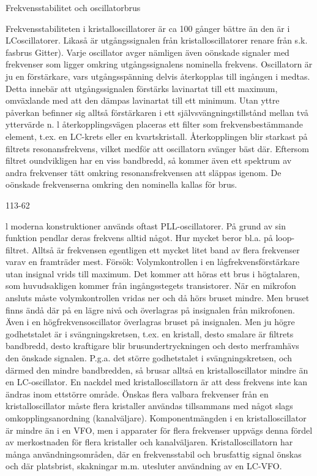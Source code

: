 \documentclass[a4paper,twoside,twocolumn,openright]{book}
\begin{document}
{{{{{{{Frekvensstabilitet och oscillatorbrus

Frekvensstabiliteten i kristalloscillatorer är
ca 100 gånger bättre än den är i LCoscillatorer. Likaså är utgångssignalen från
kristalloscillatorer renare från s.k. fasbrus
Gitter). Varje oscillator avger nämligen även
oönskade signaler med frekvenser som ligger omkring utgångssignalens nominella
frekvens.
Oscillatorn är ju en förstärkare, vars utgångsspänning delvis återkopplas till ingången i medtas. Detta innebär att utgångssignalen förstärks lavinartat till ett maximum, omväxlande med att den dämpas lavinartat till
ett minimum. Utan yttre påverkan befinner
sig alltså förstärkaren i ett självsvängningstillstånd mellan två yttervärde n. l återkopplingsvägen placeras ett filter som frekvensbestämmande element, t.ex. en LC-krets
eller en kvartskristall.
Återkopplingen blir starkast på filtrets
resonansfrekvens, vilket medför att oscillatorn svänger bäst där. Eftersom filtret oundvikligen har en viss bandbredd, så kommer
även ett spektrum av andra frekvenser tätt
omkring resonansfrekvensen att släppas
igenom. De oönskade frekvenserna omkring
den nominella kallas för brus.

113-62

l moderna konstruktioner används oftast
PLL-oscillatorer. På grund av sin funktion
pendlar deras frekvens alltid något. Hur
mycket beror bl.a. på loop-filtret. Alltså är
frekvensen egentligen ett mycket litet band
av flera frekvenser varav en framträder mest.
Försök:
Volymkontrollen i en lågfrekvensförstärkare
utan insignal vrids till maximum. Det kommer att höras ett brus i högtalaren, som
huvudsakligen kommer från ingångsstegets
transistorer. När en mikrofon ansluts måste
volymkontrollen vridas ner och då hörs bruset
mindre. Men bruset finns ändå där på en
lägre nivå och överlagras på insignalen från
mikrofonen.
Även i en högfrekvensoscillator överlagras bruset på insignalen. Men ju högre godhetstalet är i svängningskretsen, t.ex. en
kristall, desto smalare är filtrets bandbredd,
desto kraftigare blir brusundertryckningen
och desto merframhävs den önskade signalen. P.g.a. det större godhetstalet i svängningskretsen, och därmed den mindre bandbredden, så brusar alltså en kristalloscillator
mindre än en LC-oscillator.
En nackdel med kristalloscillatorn är att
dess frekvens inte kan ändras inom ettstörre
område. Önskas flera valbara frekvenser
från en kristalloscillator måste flera kristaller
användas tillsammans med något slags
omkopplingsanordning (kanalväljare).
Komponentmängden i en kristalloscillator
är mindre än i en VFO, men i apparater för
flera frekvenser uppvägs denna fördel av
merkostnaden för flera kristaller och kanalväljaren.
Kristalloscillatorn har många användningsområden, där en frekvensstabil och
brusfattig signal önskas och där platsbrist,
skakningar m.m. utesluter användning av en
LC-VFO.

}}}}}}}
\end{document}

